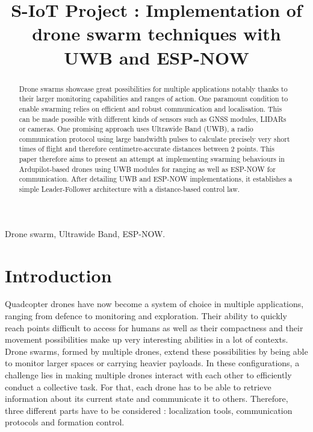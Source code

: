 \documentclass[conference]{IEEEtran}
\begin{document}
\title{S-IoT Project : Implementation of drone swarm techniques with UWB and ESP-NOW \\
}

\author{
\and
{}
}

\maketitle

\begin{abstract}
Drone swarms showcase great possibilities for multiple applications notably thanks to their larger monitoring capabilities and ranges of action. One paramount condition to enable swarming relies on efficient and robust communication and localisation. This can be made possible with different kinds of sensors such as GNSS modules, LIDARs or cameras. One promising approach uses Ultrawide Band (UWB), a radio communication protocol using large bandwidth pulses to calculate precisely very short times of flight and therefore centimetre-accurate distances between 2 points. This paper therefore aims to present an attempt at implementing swarming behaviours in Ardupilot-based drones using UWB modules for ranging as well as ESP-NOW for communication. After detailing UWB and ESP-NOW implementations, it establishes a simple Leader-Follower architecture with a distance-based control law. 
\end{abstract}

\begin{IEEEkeywords}
Drone swarm, Ultrawide Band, ESP-NOW.
\end{IEEEkeywords}

\section{Introduction}

Quadcopter drones have now become a system of choice in multiple applications, ranging from defence to monitoring and exploration. Their ability to quickly reach points difficult to access for humans as well as their compactness and their movement possibilities make up very interesting abilities in a lot of contexts. Drone swarms, formed by multiple drones, extend these possibilities by being able to monitor larger spaces or carrying heavier payloads. In these configurations, a challenge lies in making multiple drones interact with each other to efficiently conduct a collective task. For that, each drone has to be able to retrieve information about its current state and communicate it to others. Therefore, three different parts have to be considered : localization tools, communication protocols and formation control.
\end{document}
